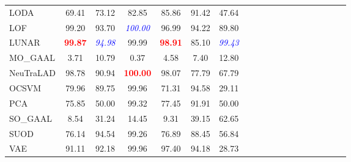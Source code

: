 \begin{table}
\begin{tabular}{l ccc ccc ccc ccc ccc ccc}
LODA & 69.41 & 73.12 & 82.85 & 85.86 & 91.42 & 47.64 \\
LOF & 99.20 & 93.70 & \textcolor{blue}{\textit{100.00}} & 96.99 & 94.22 & 89.80 \\
LUNAR & \textcolor{red}{\textbf{99.87}} & \textcolor{blue}{\textit{94.98}} & 99.99 & \textcolor{red}{\textbf{98.91}} & 85.10 & \textcolor{blue}{\textit{99.43}} \\
MO\_GAAL & 3.71 & 10.79 & 0.37 & 4.58 & 7.40 & 12.80 \\
NeuTraLAD & 98.78 & 90.94 & \textcolor{red}{\textbf{100.00}} & 98.07 & 77.79 & 67.79 \\
OCSVM & 79.96 & 89.75 & 99.96 & 71.31 & 94.58 & 29.11 \\
PCA & 75.85 & 50.00 & 99.32 & 77.45 & 91.91 & 50.00 \\
SO\_GAAL & 8.54 & 31.24 & 14.45 & 9.31 & 39.15 & 62.65 \\
SUOD & 76.14 & 94.54 & 99.26 & 76.89 & 88.45 & 56.84 \\
VAE & 91.11 & 92.18 & 99.96 & 97.40 & 94.18 & 28.73 \\
\bottomrule
\end{tabular}
\label{tab:model_noise_perf}
\end{table}